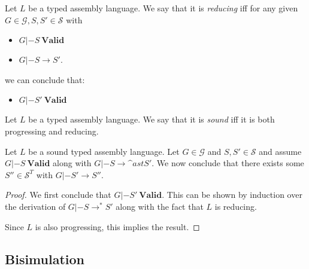 \begin{definition}
  Let $L$ be a typed assembly language. We say that it is \emph{reducing} iff
  for any given $G \in \mathcal{G}, S, S' \in \mathcal{S}$ with

  \begin{itemize}
  \item $G |- S\ \mathbf{Valid}$
  \item $G |- S \to S'$.
  \end{itemize}

  we can conclude that:

  \begin{itemize}
  \item $G |- S'\ \mathbf{Valid}$
  \end{itemize}
\end{definition}

\begin{definition}
  Let $L$ be a typed assembly language. We say that it is \emph{sound} iff it is
  both progressing and reducing.
\end{definition}

\begin{theorem}[Soundness]
  Let $L$ be a sound typed assembly language. Let $G \in \mathcal{G}$ and
  $S, S' \in \mathcal{S}$ and assume $G |- S\ \mathbf{Valid}$ along with
  $G |- S \to\^ast S'$. We now conclude that there exists some
  $S'' \in \mathcal{S}^T$ with $G |- S' \to S''$.
\end{theorem}

\begin{proof}
  We first conclude that $G |- S'\ \mathbf{Valid}$. This can be shown by
  induction over the derivation of $G |- S \to^\ast S'$ along with the fact that
  $L$ is reducing.

  Since $L$ is also progressing, this implies the result.
\end{proof}

\subsection{Bisimulation}

